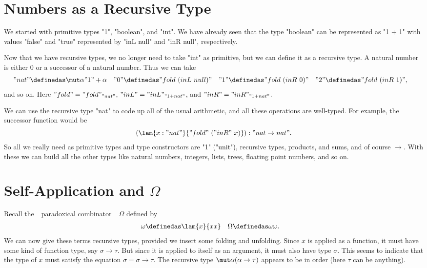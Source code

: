 \section{Numbers as a Recursive Type}

We started with primitive types "1", "boolean", and "int". We have already seen that the type "boolean" can be represented as "1 + 1" with values "false" and "true" represented by "inL null" and "inR null", respectively.

Now that we have recursive types, we no longer need to take "int" as primitive, but we can define it as a recursive type. A natural number is either $0$ or a successor of a natural number. Thus we can take
\begin{align*}
"nat" &\definedas \mut\alpha{"1" + \alpha} &
"0" &\definedas "fold~(inL~null)" &
"1" &\definedas "fold~(inR~0)" &
"2" &\definedas "fold~(inR~1)",
\end{align*}
and so on. Here $"fold" = "fold"_{"nat"}$, $"inL" = "inL"_{"1+nat"}$, and $"inR" = "inR"_{"1+nat"}$.

We can use the recursive type "nat" to code up all of the usual arithmetic, and all these operations are well-typed. For example, the successor function would be
\[
(\lam{x : "nat"}{"fold"~("inR"~x)}) : "nat \to nat".
\]
So all we really need as primitive types and type constructors are "1" ("unit"), recursive types, products, and sums, and of course $\to$. With these we can build all the other types like natural numbers, integers, lists, trees, floating point numbers, and so on.

\section{Self-Application and $\Omega$}

Recall the _paradoxical combinator_ $\Omega$ defined by
\begin{align*}
\omega &\definedas \lam{x}{xx} &
\Omega &\definedas \omega\omega.
\end{align*}
We can now give these terms recursive types, provided we insert some folding and unfolding. Since $x$ is applied as a function, it must have some kind of function type, say $\sigma\to\tau$. But since it is applied to itself as an argument, it must also have type $\sigma$. This seems to indicate that the type of $x$ must satisfy the equation $\sigma=\sigma\to\tau$. The recursive type $\mut\alpha{(\alpha\to\tau)}$ appears to be in order (here $\tau$ can be anything).

